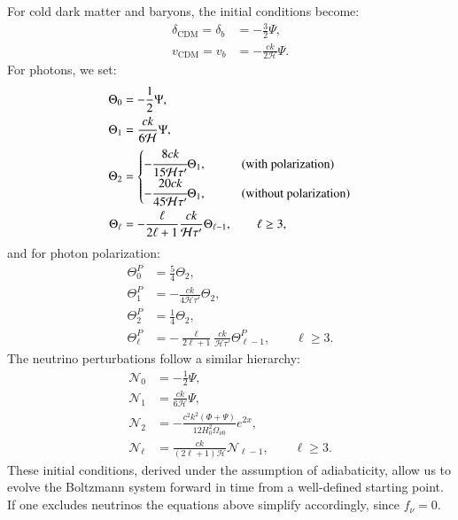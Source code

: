 \documentclass{aa}
\numberwithin{equation}{section}
\numberwithin{table}{section}
\numberwithin{figure}{section}
\begin{document}
For cold dark matter and baryons, the initial conditions become:
\begin{align}
\delta_\text{CDM} = \delta_b &= -\frac{3}{2}\Psi, \\
v_\text{CDM} = v_b &= -\frac{ck}{2\mathcal{H}} \Psi.
\end{align}
For photons, we set:
\begin{align}
\Theta_0 &= -\frac{1}{2} \Psi, \\
\Theta_1 &= \frac{ck}{6\mathcal{H}} \Psi, \\
\Theta_2 &= \begin{cases}-\cfrac{8ck}{15\mathcal{H} \tau'} \Theta_1, \qquad&\text{(with polarization)} \\
  -\cfrac{20ck}{45\mathcal{H} \tau'} \Theta_1, \hspace{3pt}&\text{(without polarization)}
\end{cases} \label{eq: initial quadrupole} \\
\Theta_\ell &= -\frac{\ell}{2\ell+1} \frac{ck}{\mathcal{H} \tau'} \Theta_{\ell-1}, \qquad \ell \geq 3,
\end{align}
and for photon polarization:
\begin{align}
\Theta_0^P &= \frac{5}{4} \Theta_2, \\
\Theta_1^P &= -\frac{ck}{4\mathcal{H} \tau'} \Theta_2, \\
\Theta_2^P &= \frac{1}{4} \Theta_2, \\
\Theta_\ell^P &= -\frac{\ell}{2\ell+1} \frac{ck}{\mathcal{H} \tau'} \Theta_{\ell-1}^P, \qquad \ell \geq 3. \label{eq: initial polarization multipole}
\end{align}
The neutrino perturbations follow a similar hierarchy:
\begin{align}
\mathcal{N}_0 &= -\frac{1}{2} \Psi, \\
\mathcal{N}_1 &= \frac{ck}{6\mathcal{H}} \Psi, \\
\mathcal{N}_2 &= -\frac{c^2 k^2  (\Phi + \Psi)}{12 H_0^2\Omega_{\nu0}}e^{2x}, \\
\mathcal{N}_\ell &= \frac{ck}{(2\ell+1)\mathcal{H}} \mathcal{N}_{\ell-1}, \qquad \ell \geq 3.
\end{align}
These initial conditions, derived under the assumption of adiabaticity, allow us to evolve the Boltzmann system forward in time from a well-defined starting point. If one excludes neutrinos the equations above simplify accordingly, since $f_\nu=0$. 
\end{document}

